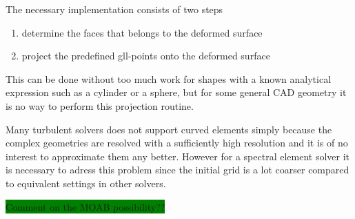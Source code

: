 The necessary implementation consists of two steps 
%
\begin{enumerate}
    \item determine the faces that belongs to the deformed surface
    \item project the predefined gll-points onto the deformed surface
\end{enumerate}
%
This can be done without too much work for shapes with a known analytical 
expression such as a cylinder or a sphere, but for some general CAD geometry 
it is no way to perform this projection routine. 

Many turbulent solvers does not support curved elements simply because the 
complex geometries are resolved with a sufficiently high resolution and it 
is of no interest to approximate them any better. However for a spectral element
solver it is necessary to adress this problem since the initial grid is a lot coarser
compared to equivalent settings in other solvers.

\colorbox{green}{Comment on the MOAB possibility??}

